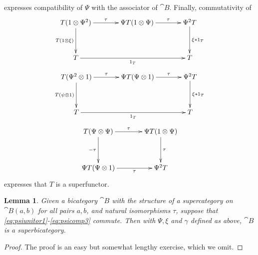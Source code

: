 \documentclass[english,letter paper,12pt,leqno]{article}
\newtheorem{lemma}[theorem]{Lemma}
\theoremstyle{example}
\numberwithin{equation}{section}
\begin{document}
expresses compatibility of $\Psi$ with the associator of $\cat{B}$. Finally, commutativity of
\begin{equation}\label{eq:psicomp1}
\xymatrix@R+1pc@C+1pc{
T( 1 \otimes \Psi^2 ) \ar[r]^-{\tau}\ar[d]_-{T(1 \otimes \xi)} & \Psi T( 1 \otimes \Psi ) \ar[r]^-{\tau} & \Psi^2 T \ar[d]^-{\xi * 1_T}\\
T \ar[rr]_-{1_T} & & T
}
\end{equation}
\begin{equation}\label{eq:psicomp2}
\xymatrix@R+1pc@C+1pc{
T( \Psi^2 \otimes 1 ) \ar[r]^-{\tau} \ar[d]_-{T (\psi \otimes 1)}  & \Psi T( \Psi \otimes 1 ) \ar[r]^-{\tau} & \Psi^2 T \ar[d]^-{\xi * 1_T}\\
T \ar[rr]_-{1_T} & & T
}
\end{equation}
\begin{equation}\label{eq:psicomp3}
\xymatrix@R+1pc@C+1pc{
T( \Psi \otimes \Psi ) \ar[r]^-{\tau}\ar[d]_-{-\tau} & \Psi T( 1 \otimes \Psi ) \ar[d]^-{\tau}\\
\Psi T( \Psi \otimes 1 ) \ar[r]_-{\tau} & \Psi^2 T
}
\end{equation}
expresses that $T$ is a superfunctor.

\begin{lemma}\label{lemma:constructingsuper}
Given a bicategory $\cat{B}$ with the structure of a supercategory on $\cat{B}(a,b)$ for all pairs $a,b$, and natural isomorphisms $\tau$, suppose that \eqref{eq:psiunitor1}-\eqref{eq:psicomp3} commute. Then with $\Psi, \xi$ and $\gamma$ defined as above, $\cat{B}$ is a superbicategory.
\end{lemma}
\begin{proof}
The proof is an easy but somewhat lengthy exercise, which we omit.
\end{proof}
\end{document}
